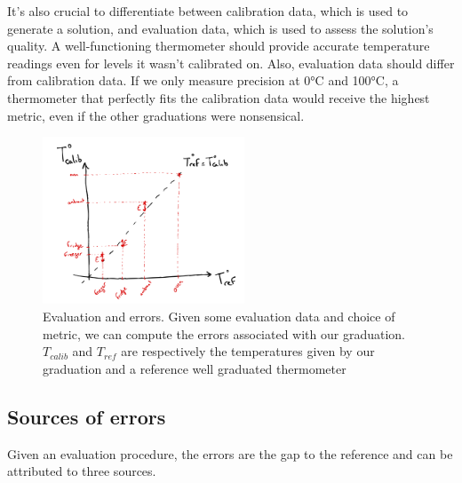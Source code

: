 \begin{bibunit}
It's also crucial to differentiate between calibration data, which is used to generate a solution, and evaluation data, which is used to assess the solution's quality.
A well-functioning thermometer should provide accurate temperature readings even for levels it wasn't calibrated on. Also, evaluation data should differ from calibration data. If we only measure precision at 0°C and 100°C, a thermometer that perfectly fits the calibration data would receive the highest metric, even if the other graduations were nonsensical.

\begin{figure}
\includegraphics[clip, width=6cm]{Introduction/pics/errors.png}  
    \centering
    \caption{Evaluation and errors. Given some evaluation data and choice of metric, we can compute the errors associated with our graduation. $T_{calib}$ and $T_{ref}$ are respectively the temperatures given by our graduation and a reference well graduated thermometer}
    \label{fig:err_sources}
\end{figure}



 \subsection{Sources of errors}

Given an evaluation procedure, the errors are the gap to the reference and can be attributed to three sources.

\begin{figure}
\begin{tabular}{c |c|c}


\end{tabular}
\end{figure}
\end{bibunit}
